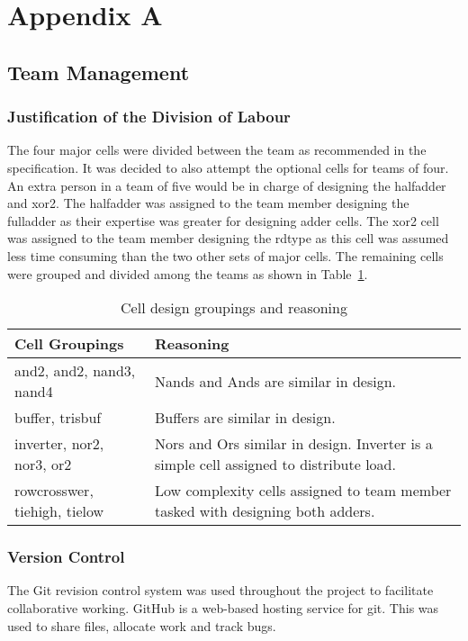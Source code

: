 \clearpage
\section{Appendix A}

\subsection{Team Management}

\subsubsection{Justification of the Division of Labour}

The four major cells were divided between the team as recommended in the specification.
It was decided to also attempt the optional cells for teams of four.
An extra person in a team of five would be in charge of designing the halfadder and xor2.
The halfadder was assigned to the team member designing the fulladder as their expertise was greater for designing adder cells.
The xor2 cell was assigned to the team member designing the rdtype as this cell was assumed less time consuming than the two other sets of major cells.
The remaining cells were grouped and divided among the teams as shown in Table~\ref{tab:cells}.

\begin{table}[h]
   \centering
    \begin{tabular}{| p{4.5cm} | p{6.5cm} |}
    \hline
      \textbf{Cell Groupings} & \textbf{Reasoning}\\ \hline
      and2, and2, nand3, nand4  &	Nands and Ands are similar in design.\\ \hline
      buffer, trisbuf  &	Buffers are similar in design.\\ \hline
      inverter, nor2, nor3, or2   &	 Nors and Ors similar in design. Inverter is a simple cell assigned to distribute load.\\ \hline
      rowcrosswer, tiehigh, tielow &	Low complexity cells assigned to team member tasked with designing both adders.\\ \hline
    \end{tabular}
    \caption{Cell design groupings and reasoning}
    \label{tab:cells}
\end{table}

\subsubsection{Version Control}
The Git revision control system was used throughout the project to facilitate collaborative working.
GitHub is a web-based hosting service for git. 
This was used to share files, allocate work and track bugs.

